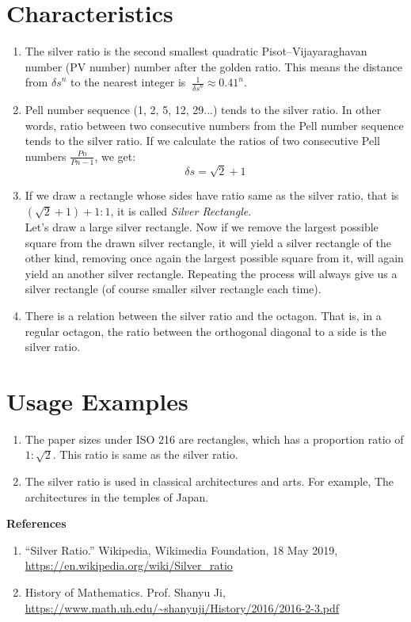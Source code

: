 \documentclass[letterpaper]{article}
\begin{document}
\section{Characteristics}
\begin{enumerate}

\item The silver ratio is the second smallest quadratic Pisot–Vijayaraghavan number (PV number) number after the golden ratio. This means the distance from \({\delta s}^n\) to the nearest integer is \(\ \frac{1}{{\delta s}^n}  \approx  {0.41}^n \).

  \item Pell number sequence (1, 2, 5, 12, 29...) tends to the silver ratio. In other words, ratio between two consecutive numbers from the Pell number sequence tends to the silver ratio. If we calculate the ratios of two consecutive Pell numbers \( \frac{Pn}{Pn-1} \), we get:
  \[  \delta s = \sqrt{2} + 1 \]
  
  \item If we draw a rectangle whose sides have ratio same as the silver ratio, that is \( (\sqrt{2} + 1) + 1 : 1\), it is called \emph{Silver Rectangle}. \\
Let's draw a large silver rectangle. Now if we remove the largest possible square from the drawn silver rectangle, it will yield a silver rectangle of the other kind, removing once again the largest possible square from it, will again yield an another silver rectangle. Repeating the process will always give us a silver rectangle (of course smaller silver rectangle each time).

 \item There is a relation between the silver ratio and the octagon. That is, in a regular octagon, the ratio between the orthogonal diagonal to a side is the silver ratio.
\end{enumerate}

\section{Usage Examples}
\begin{enumerate}
  \item The paper sizes under ISO 216 are rectangles, which has a proportion ratio of \( 1:\sqrt{2} \). This ratio is same as the silver ratio.
  \item The silver ratio is used in classical architectures and arts. For example, The architectures in the temples of Japan. \\
\end{enumerate}


\textbf{References} 
\begin{enumerate}
 \item “Silver Ratio.” Wikipedia, Wikimedia Foundation, 18 May 2019, \url{https://en.wikipedia.org/wiki/Silver_ratio}
 \item History of Mathematics. Prof. Shanyu Ji, \url{https://www.math.uh.edu/~shanyuji/History/2016/2016-2-3.pdf}
\end{enumerate}
\end{document}
